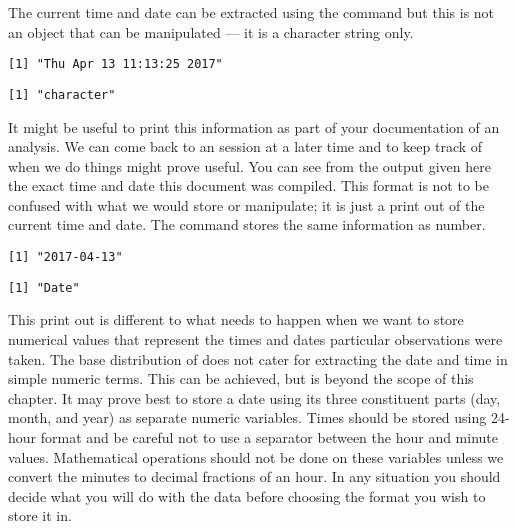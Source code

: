 The current time and date can be extracted using the  command but this is not an object that can be manipulated --- it is a character string only. 
\begin{knitrout}
\color{fgcolor}\begin{kframe}
\begin{alltt}
\hlstd{> }\hlstd{()}
\end{alltt}
\begin{verbatim}
[1] "Thu Apr 13 11:13:25 2017"
\end{verbatim}
\begin{alltt}
\hlstd{> }\hlstd{(}\hlstd{())}
\end{alltt}
\begin{verbatim}
[1] "character"
\end{verbatim}
\end{kframe}
\end{knitrout}
It might be useful to print this information as part of your documentation of an analysis. We can come back to an \R{} session at a later time and to keep track of when we do things might prove useful. You can see from the output given here the exact time and date this document was compiled. This format is not to be confused with what we would store or manipulate; it is just a print out of the current time and date. The  command stores the same information as number. 
\begin{knitrout}
\color{fgcolor}\begin{kframe}
\begin{alltt}
\hlstd{> }\hlstd{()}
\end{alltt}
\begin{verbatim}
[1] "2017-04-13"
\end{verbatim}
\begin{alltt}
\hlstd{> }\hlstd{(}\hlstd{())}
\end{alltt}
\begin{verbatim}
[1] "Date"
\end{verbatim}
\end{kframe}
\end{knitrout}
 
This print out is different to what needs to happen when we want to store numerical values that represent the times and dates particular observations were taken. The base distribution of \R{} does not cater for extracting the date and time in simple numeric terms. This can be achieved, but is beyond the scope of this chapter. It may prove best to store a date using its three constituent parts (day, month, and year) as separate numeric variables. Times should be stored using 24-hour format and be careful not to use a separator between the hour and minute values. Mathematical operations should not be done on these variables unless we convert the minutes to decimal fractions of an hour. In any situation you should decide what you will do with the data before choosing the format you wish to store it in. 
 
